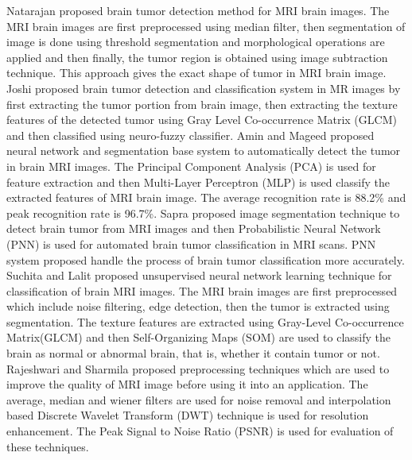 	Natarajan \cite{bac1} proposed brain tumor detection method for MRI brain
	images. The MRI brain images are first preprocessed using median filter,
	then segmentation of image is done using threshold segmentation and
	morphological operations are applied and then finally, the tumor region is
	obtained using image subtraction technique. This approach gives the exact
	shape of tumor in MRI brain image. Joshi \cite{bac2} proposed brain tumor
	detection and classification system in MR images by first extracting the
	tumor portion from brain image, then extracting the texture features of the
	detected tumor using Gray Level Co-occurrence Matrix (GLCM) and then
	classified using neuro-fuzzy classifier. Amin and Mageed \cite{bac3}
	proposed neural network and segmentation base system to automatically detect
	the tumor in brain MRI images. The Principal Component Analysis (PCA) is
	used for feature extraction and then Multi-Layer Perceptron (MLP) is used
	classify the extracted features of MRI brain image. The average recognition
	rate is 88.2\% and peak recognition rate is 96.7\%. Sapra \cite{bac4}
	proposed image segmentation technique to detect brain tumor from MRI images
	and then Probabilistic Neural Network (PNN) is used for automated brain
	tumor classification in MRI scans. PNN system proposed handle the process of
	brain tumor classification more accurately. Suchita and Lalit \cite{bac5}
	proposed unsupervised neural network learning technique for classification
	of brain MRI images. The MRI brain images are first preprocessed which
	include noise filtering, edge detection, then the tumor is extracted using
	segmentation. The texture features are extracted using Gray-Level
	Co-occurrence Matrix(GLCM) and then Self-Organizing Maps (SOM) are used to
	classify the brain as normal or abnormal brain, that is, whether it contain
	tumor or not. Rajeshwari and Sharmila \cite{bac6} proposed preprocessing
	techniques which are used to improve the quality of MRI image before using
	it into an application. The average, median and wiener filters are used for
	noise removal and interpolation based Discrete Wavelet Transform (DWT)
	technique is used for resolution enhancement. The Peak Signal to Noise Ratio
	(PSNR) is used for evaluation of these techniques.

